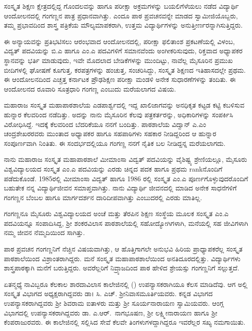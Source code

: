 {ಸಂಸ್ಕೃತ ಶಿಕ್ಷಣ ಕ್ಷೇತ್ರದಲ್ಲಿದ್ದ ಗೊಂದಲವನ್ನು ಹಾಗೂ ಪರೀಕ್ಷಾ ಅಕ್ರಮಗಳನ್ನು ಬಯಲಿಗೆಳೆಯಲು ನಡೆದ ವಿದ್ಯಾರ್ಥಿ ಆಂದೋಲನದಲ್ಲಿ ಗಂಗಣ್ಣನ ಪಾತ್ರ ಪ್ರಧಾನ\-ವಾಗಿತ್ತು. ಎಂದೂ ಪಾಠ  \enginline{-}  ಪ್ರವಚನ\-ವನ್ನೇ ಮಾಡದ ಸ್ವಾಮೀಜಿಯೊಬ್ಬರು, ತಮ್ಮ  ಪ್ರಭಾವ\-ದಿಂದ ಶಾಸ್ತ್ರ ಪತ್ರಿಕೆಯ ಮೌಲ್ಯಮಾಪಕರಾಗಿ, ಉತ್ತಮ ವಿದ್ಯಾರ್ಥಿಗಳನ್ನು ಅನುತ್ತೀರ್ಣರನ್ನಾಗಿಸುತ್ತಿದ್ದರು. 
\vskip 3pt

ಈ ಅನ್ಯಾಯವನ್ನು ಪ್ರತಿಭಟಿಸಲು ಆರಂಭವಾದ ಆಂದೋಲನದಲ್ಲಿ, ಪರೀಕ್ಷಾ \hbox{ಫಲಿತಾಂಶ} ಪ್ರಕಟಣೆಯಲ್ಲಿ ವಿಳಂಬ, ವಿದ್ವತ್ ಪದವಿಯನ್ನು ಬಿ.ಎ  ಹಾಗೂ  ಎಂ.ಎ ಪದವಿಗಳಿಗೆ ಸಮಾನವೆಂದು ಅಂಗೀಕರಿಸುವುದು, ರಿಕ್ತವಾದ ಅಧ್ಯಾಪಕರ ಸ್ಥಾನವನ್ನು  ಭರ್ತಿ ಮಾಡುವುದು, ಇವೇ ಮೊದಲಾದ ಬೇಡಿಕೆಗಳನ್ನು ಮುಂದಿಟ್ಟು, ನಾವೆಲ್ಲ ಮೈಸೂರಿನ ಪ್ರಮುಖ ಬೀದಿಗಳಲ್ಲಿ ಘೋಷಣೆ ಕೂಗುತ್ತ, ಕರಪತ್ರಗಳನ್ನು ಹಂಚುತ್ತ, ಸಂಚರಿಸಿದ್ದು, ಸಂಸ್ಕೃತ ಶಿಕ್ಷಣದ ಇತಿಹಾಸದಲ್ಲೇ ಪ್ರಥಮ. ಈ ಆಂದೋಲನದಿಂದ ಎಚ್ಚತ್ತ ಕರ್ನಾಟಕ ಪ್ರೌಢಶಿಕ್ಷಣ ಪರೀಕ್ಷಾ ಮಂಡಳಿ ಅನೇಕ ಸುಧಾರಣೆಗಳನ್ನು ತಂದಿತು. ಈ \hbox{ಆಂದೋಲನದ} ರೂವಾರಿ   \enginline{-}   ಸೂತ್ರಧಾರಿ ಗಂಗಣ್ಣ  ಎಂಬುದು ಮರೆಯಲಾಗದ ವಿಷಯ.

ಮಹಾರಾಜ ಸಂಸ್ಕೃತ ಮಹಾಪಾಠಶಾಲೆಯ ಎಡಪಾರ್ಶ್ವದಲ್ಲಿ ಇದ್ದ ಖಾಲಿಜಾಗವನ್ನು ಅನಧಿಕೃತ ಕಟ್ಟಡ ಕಟ್ಟಿ ಕಬಳಿಸುವ ಹುನ್ನಾರ ಕೆಲವರಿಂದ ನಡೆದಿತ್ತು. ಅದನ್ನು ನಾನು ಮೈಸೂರಿನ ಕೆಲವು  ಪತ್ರಕರ್ತರನ್ನು, ಅಧಿಕಾರಿಗಳನ್ನು ಸಂಪರ್ಕಿಸಿ ವಿರೋಧಿಸಿದ್ದೆ. ಇದಕ್ಕೆ ಕೆಲವರಿಂದ ಬೆದರಿಕೆಯೂ ನನಗೆ ಬಂದಿತ್ತು. ಪಾಠಶಾಲೆಯ ವಿದ್ವಾನ್ ಎ.ಎಂ ಚಂದ್ರಶೇಖರರವರು ಮುಂತಾದ ಅಧ್ಯಾಪಕರ ಹಾಗೂ ಸಹಪಾಠಿಗಳು ಸಹಕಾರ ನೀಡಿದ್ದರಿಂದ ಆ ಹುನ್ನಾರ ಸಂಪೂರ್ಣವಾಗಿ ನಿಂತಿತು. ಈ ಸಂದರ್ಭದಲ್ಲಿಯೂ ಗಂಗಣ್ಣ ನನಗೆ ನೈತಿಕ ಬಲ ನೀಡಿದ್ದನ್ನ ಮರೆಯಲಾಗದು.

ನಾನು ಮಹಾರಾಜ ಸಂಸ್ಕೃತ ಮಹಾಪಾಠಶಾಲೆ ಮೀಮಾಂಸಾ ವಿದ್ವತ್ ಪದವಿ\-ಯನ್ನು ವೈಶಿಷ್ಟ್ಯ ಶ್ರೇಣಿಯಲ್ಲೂ, ಮೈಸೂರು  ವಿಶ್ವವಿದ್ಯಾಲಯದ ಸಂಸ್ಕೃತ  ಎಂ.ಎ ಪದವಿ\-ಯನ್ನು ಎರಡು ಚಿನ್ನದ ಪದಕ ಹಾಗೂ ಪ್ರಥಮ  rankನೊಂದಿಗೆ ಪಡೆದುಕೊಂಡೆ. 1985ರಲ್ಲಿ ಮೀಮಾಂಸಾ ವಿದ್ವತ್ ಹಾಗೂ 1986 ರಲ್ಲಿ ಸಂಸ್ಕೃತ ಎಂ.ಎ ಪೂರ್ಣಗೊಳ್ಳುವುದರೊಂದಿಗೆ ಬಹುತೇಕ ನನ್ನ ವಿದ್ಯಾರ್ಥಿಜೀವನ ಸಮಾಪ್ತವಾಗಿತ್ತು. ನಾನು ವಿದ್ಯಾರ್ಥಿ ಜೀವನದಲ್ಲಿ ಮಾಡಿದ ಅನೇಕ ಸಾಧನೆಗಳಿಗೆ ಗಂಗಣ್ಣನ ಬೆಂಬಲ ಹಾಗೂ ಮಾರ್ಗ\-ದರ್ಶನ ದಾರಿದೀಪವಾಗಿತ್ತು ಎಂಬುದರಲ್ಲಿ ಎರಡು ಮಾತಿಲ್ಲ.

ಗಂಗಣ್ಣನೂ ಮೈಸೂರು ವಿಶ್ವವಿದ್ಯಾಲಯದ ಅಂಚೆ ಮತ್ತು ತೆರಪಿನ ಶಿಕ್ಷಣ ಸಂಸ್ಥೆಯ ಮೂಲಕ ಸಂಸ್ಕೃತ ಎಂ.ಎ ಪದವಿಯನ್ನೂ ಸಂಪಾದಿಸಿದ್ದ, ಶ್ರೀ ಶಂಕರವಿಲಾಸ ಪಾಠ\-ಶಾಲೆಯಲ್ಲಿ ಸಹೋದ್ಯೋಗಿಗಳಾಗಿ, ಮನೆಯಲ್ಲಿ ಸಹ ಜೀವಿಗಳಾಗಿ ನಮ್ಮ ಜೀವನ ನೆಮ್ಮದಿ\-ಯಿಂದ ಸಾಗಿತ್ತು.

ಪಾಠ  \enginline{-}  ಪ್ರವಚನ ಗಂಗಣ್ಣನಿಗೆ ನೆಚ್ಚಿನ ವಿಷಯವಾಗಿತ್ತು, ಆ ಹೊತ್ತಿಗಾಗಲೇ ಅನುಭವಿ  ಹಿರಿಯ ಪ್ರಾಧ್ಯಾಪಕರೆಲ್ಲ ಸಂಸ್ಕೃತ  ಪಾಠಶಾಲೆಯಿಂದ ವಿಶ್ರಾಂತರಾಗಿದ್ದರು. ಮನೆ ಸಂಸ್ಕೃತ ಮಹಾಪಾಠಶಾಲೆಯಿಂದ ಅನತಿದೂರದಲ್ಲಿತ್ತು. ವಿದ್ಯಾರ್ಥಿಗಳು ಶಾಸ್ತ್ರಪಾಠಕ್ಕಾಗಿ ಮನೆಗೆ ಬರುತ್ತಿದ್ದರು. ಅವರೆಲ್ಲರಿಗೆ ನಿವ್ರ್ಯಾಜದಿಂದ ಪಾಠ ಹೇಳಿದ ಶ್ರೇಯಸ್ಸು ಗಂಗಣ್ಣನಿಗೆ ಸಲ್ಲುತ್ತದೆ.

ಏತನ್ಮಧ್ಯೆ ನಾವಿಬ್ಬರೂ ಕೆಲಕಾಲ ಶಾರದಾವಿಲಾಸ ಕಾಲೇಜಿನಲ್ಲಿ () ಉಪನ್ಯಾಸಕರಾಗಿಯೂ ಕೆಲಸ ಮಾಡಿದೆವು. ಆಗ ಅಲ್ಲಿ ಸಂಸ್ಕೃತ ವಿಭಾಗದ ಅಧ್ಯಕ್ಷರಾಗಿದ್ದವರು ಡಾ। ಸಿ. ಎಚ್. ಶ್ರೀನಿವಾಸಮೂರ್ತಿಯವರು. ಕನ್ನಡ ವಿಭಾಗದ ಉಪನ್ಯಾಸಕ\-ರಾಗಿದ್ದವರು ಶ್ರೀ ಶಿವರಾಮ ಐತಾಳರು ಮತ್ತು ಶ್ರೀ ಸೂರ್ಯನಾರಾಯಣ ಸ್ವಾಮಿಯವರು. ಆಂಗ್ಲ ವಿಭಾಗದಲ್ಲಿ ಉಪನ್ಯಾಸಕರಾಗಿದ್ದವರು ಡಾ. ಎ.ಆರ್.\ ನಾಗಭೂಷಣ, ಶ್ರೀ ಲಕ್ಷ್ಮೀನಾರಾಯಣ ಹಾಗೂ ಶ್ರೀ ಕೆಂಪರಾಜುರವರು. ಈ ಕಾಲೇಜಿನಲ್ಲಿ ಸಲ್ಲಿಸಿದ ಸೇವೆ ಕೆಲವೇ ತಿಂಗಳುಗಳದ್ದಾಗಿದ್ದರೂ ಇವರೆಲ್ಲರ ಸಖ್ಯ ನಮಗಾಯಿತು. 

}
